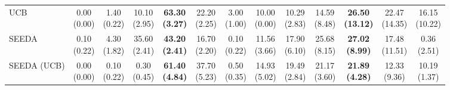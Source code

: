 \begin{table}[H]
{\begin{tabular}{l|cccccc|cccccc}
UCB & \makecell{0.00 \\ (0.00)} & \makecell{1.40 \\ (0.22)} & {\cellcolor[HTML]{C8E6C9}} \makecell{10.10 \\ (2.95)} & \bfseries \makecell{63.30 \\ (3.27)} & \makecell{22.20 \\ (2.25)} & \makecell{3.00 \\ (1.00)} & \makecell{10.00 \\ (0.00)} & \makecell{10.29 \\ (2.83)} & {\cellcolor[HTML]{C8E6C9}} \makecell{14.59 \\ (8.48)} & \bfseries \makecell{26.50 \\ (13.12)} & \makecell{22.47 \\ (14.35)} & \makecell{16.15 \\ (10.22)} \\
SEEDA & \makecell{0.10 \\ (0.22)} & \makecell{4.30 \\ (1.82)} & {\cellcolor[HTML]{C8E6C9}} \makecell{35.60 \\ (2.41)} & \bfseries \makecell{43.20 \\ (2.41)} & \makecell{16.70 \\ (2.20)} & \makecell{0.10 \\ (0.22)} & \makecell{11.56 \\ (3.66)} & \makecell{17.90 \\ (6.10)} & {\cellcolor[HTML]{C8E6C9}} \makecell{25.68 \\ (8.15)} & \bfseries \makecell{27.02 \\ (8.99)} & \makecell{17.48 \\ (11.51)} & \makecell{0.36 \\ (2.51)} \\
SEEDA (UCB) & \makecell{0.00 \\ (0.00)} & \makecell{0.10 \\ (0.22)} & {\cellcolor[HTML]{C8E6C9}} \makecell{0.30 \\ (0.45)} & \bfseries \makecell{61.40 \\ (4.84)} & \makecell{37.70 \\ (5.23)} & \makecell{0.50 \\ (0.35)} & \makecell{14.93 \\ (5.02)} & \makecell{19.49 \\ (2.84)} & {\cellcolor[HTML]{C8E6C9}} \makecell{21.17 \\ (3.60)} & \bfseries \makecell{21.89 \\ (4.28)} & \makecell{12.33 \\ (9.36)} & \makecell{10.19 \\ (1.37)} \\

\end{tabular}}
\end{table}
